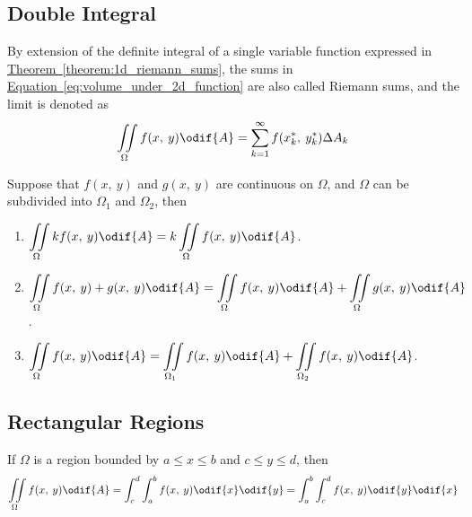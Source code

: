\documentclass{article}
\begin{document}
\subsection{Double Integral}
\begin{definition}
    By extension of the definite integral of a single variable function expressed in
    \hyperref[theorem:1d_riemann_sums]{Theorem~\ref{theorem:1d_riemann_sums}}, the sums in
    \hyperref[eq:volume_under_2d_function]{Equation~\ref{eq:volume_under_2d_function}}
    are also called Riemann sums, and the limit is denoted as
    \begin{equation*}
        \iint\limits_{\Omega} f(x,\: y)  \odif{A}
        = \sum_{k=1}^{\infty} f(x_k^\ast,\: y_k^\ast) \Delta A_k
    \end{equation*}
\end{definition}
\begin{tcolorboxlarge}[title={Properties of Double Integrals}]
    \begin{theorem}
        Suppose that \(f(x,\: y) \) and \(g(x,\: y)\) are continuous on \(\Omega\),
        and \(\Omega\) can be subdivided into \(\Omega_1\) and \(\Omega_2\), then
        \begin{enumerate}[label=\normalfont\alph*)] %
            \item $\displaystyle\iint\limits_\Omega kf(x,\: y) \odif{A}
                      = k\iint\limits_\Omega f(x,\: y) \odif{A}$.
            \item $\displaystyle\iint\limits_\Omega f(x,\: y) + g(x,\: y) \odif{A}
                      = \iint\limits_\Omega f(x,\: y) \odif{A} + \iint\limits_\Omega g(x,\: y) \odif{A}$.
            \item $\displaystyle\iint\limits_\Omega f(x,\: y) \odif{A}
                      = \iint\limits_{\Omega_1} f(x,\: y) \odif{A} + \iint\limits_{\Omega_2} f(x,\: y) \odif{A}$.
        \end{enumerate}
    \end{theorem}
\end{tcolorboxlarge}
\subsection{Rectangular Regions}
If \(\Omega\) is a region bounded by \(a \leq x \leq b\) and \(c \leq y \leq d\), then
\begin{equation*}
    \iint\limits_{\Omega} f(x,\: y) \odif{A} = \int_c^d\int_a^b f(x,\: y) \odif{x} \odif{y} = \int_a^b\int_c^d f(x,\: y) \odif{y} \odif{x}
\end{equation*}
\end{document}
